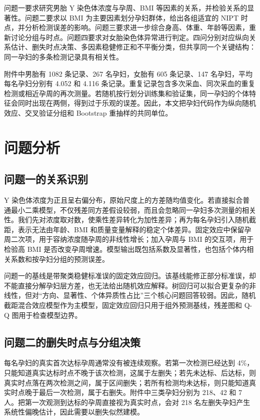\documentclass[UTF8,a4paper,12pt]{ctexart}
\begin{document}
问题一要求研究男胎 Y 染色体浓度与孕周、BMI 等因素的关系，并检验关系的显著性。问题二要求以 BMI 为主要因素划分孕妇群体，给出各组适宜的 NIPT 时点，并分析检测误差的影响。问题三要求进一步综合身高、体重、年龄等因素，重新讨论分组与时点。问题四要求对女胎染色体异常进行判定。四问分别对应纵向关系估计、删失时点决策、多因素稳健修正和不平衡分类，但共享同一个关键结构：同一孕妇的多条检测记录具有相关性。

附件中男胎有 1082 条记录、267 名孕妇，女胎有 605 条记录、147 名孕妇，平均每名孕妇分别有 4.052 和 4.116 条记录。重复记录包含多次采血、同次采血的重复检测或相近孕周的再次测量。若随机按行划分训练集和验证集，同一孕妇的个体特征会同时出现在两侧，得到过于乐观的误差。因此，本文把孕妇代码作为纵向随机效应、交叉验证分组和 Bootstrap 重抽样的共同单位。

\section{问题分析}

\subsection{问题一的关系识别}

Y 染色体浓度为正且呈右偏分布，原始尺度上的方差随均值变化。若直接拟合普通最小二乘模型，不仅残差同方差假设较弱，而且会忽略同一孕妇多次测量的相关性。我们先对浓度取对数，使乘性差异转化为加性差异；再为每名孕妇引入随机截距，表示无法由年龄、BMI 和质量变量解释的稳定个体差异。固定效应中保留孕周二次项，用于容纳浓度随孕周的非线性增长；加入孕周与 BMI 的交互项，用于检验高 BMI 是否改变孕周增速。模型输出既包括系数及显著性，也包括个体内相关系数和按孕妇分组的预测误差。

问题一的基线是带聚类稳健标准误的固定效应回归。该基线能修正部分标准误，却不能直接分解孕妇层方差，也无法给出随机效应解释。树回归可以拟合更复杂的非线性，但对“方向、显著性、个体异质性占比”三个核心问题回答较弱。因此，随机截距混合效应模型作为主模型，固定效应回归只用于组外预测基线，残差图和 Q-Q 图用于检查模型边界。

\subsection{问题二的删失时点与分组决策}

每名孕妇的真实首次达标孕周通常没有被连续观察。若第一次检测已经达到 4\%，只能知道真实达标时点不晚于该次检测，这属于左删失；若先未达标、后达标，则真实时点落在两次检测之间，属于区间删失；若所有检测均未达标，则只能知道真实时点晚于最后一次检测，属于右删失。附件中三类孕妇分别为 218、42 和 7 人。把第一次观测到达标的孕周直接视为真实时点，会对 218 名左删失孕妇产生系统性偏晚估计，因此需要以删失似然建模。
\end{document}
